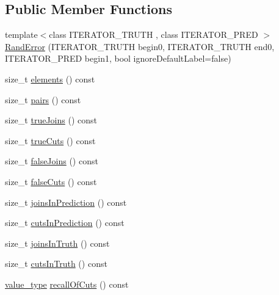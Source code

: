\subsection*{Public Member Functions}
\begin{DoxyCompactItemize}
\item 
{\footnotesize template$<$class I\+T\+E\+R\+A\+T\+O\+R\+\_\+\+T\+R\+U\+TH , class I\+T\+E\+R\+A\+T\+O\+R\+\_\+\+P\+R\+ED $>$ }\\\hyperlink{classnifty_1_1ground__truth_1_1RandError_a4ad5e727b3445b52cfe87e5f5cd68a2f}{Rand\+Error} (I\+T\+E\+R\+A\+T\+O\+R\+\_\+\+T\+R\+U\+TH begin0, I\+T\+E\+R\+A\+T\+O\+R\+\_\+\+T\+R\+U\+TH end0, I\+T\+E\+R\+A\+T\+O\+R\+\_\+\+P\+R\+ED begin1, bool ignore\+Default\+Label=false)
\item 
size\+\_\+t \hyperlink{classnifty_1_1ground__truth_1_1RandError_a4d379d420449072e4f22cbbfc4f74a89}{elements} () const
\item 
size\+\_\+t \hyperlink{classnifty_1_1ground__truth_1_1RandError_adfecfe12e12cb7522c193ce9ef17f370}{pairs} () const
\item 
size\+\_\+t \hyperlink{classnifty_1_1ground__truth_1_1RandError_ac8e59bf066a0c636d3f4d88491fe6da9}{true\+Joins} () const
\item 
size\+\_\+t \hyperlink{classnifty_1_1ground__truth_1_1RandError_a9f72a316107b733a94cfeb9e2c72a2d7}{true\+Cuts} () const
\item 
size\+\_\+t \hyperlink{classnifty_1_1ground__truth_1_1RandError_a64f748927308401935be98a4c1532ece}{false\+Joins} () const
\item 
size\+\_\+t \hyperlink{classnifty_1_1ground__truth_1_1RandError_a6b61ec21520fd45411d13e7fa8105ab2}{false\+Cuts} () const
\item 
size\+\_\+t \hyperlink{classnifty_1_1ground__truth_1_1RandError_afb89270e186dc0c9268b9fe7c5dd56d6}{joins\+In\+Prediction} () const
\item 
size\+\_\+t \hyperlink{classnifty_1_1ground__truth_1_1RandError_a818529a476307e3bb1e7081817c32ab6}{cuts\+In\+Prediction} () const
\item 
size\+\_\+t \hyperlink{classnifty_1_1ground__truth_1_1RandError_a531fb6aa48c8fe8447ebafa6d0bff042}{joins\+In\+Truth} () const
\item 
size\+\_\+t \hyperlink{classnifty_1_1ground__truth_1_1RandError_a6b07ca1f99bd60f7ebd6188344a8a635}{cuts\+In\+Truth} () const
\item 
\hyperlink{classnifty_1_1ground__truth_1_1RandError_a8ccf604387e3b5ed939c97c22c75acf9}{value\+\_\+type} \hyperlink{classnifty_1_1ground__truth_1_1RandError_a658d4aa613a71a6bb173add304aa1dff}{recall\+Of\+Cuts} () const

\end{DoxyCompactItemize}
